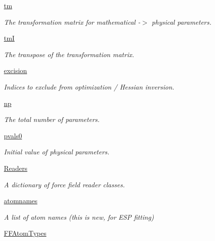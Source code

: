 \begin{DoxyCompactItemize}
\hyperlink{classforcebalance_1_1forcefield_1_1FF_a3ecc51355dbd97e0b1620007924fd2a3}{tm}
\begin{DoxyCompactList}\small\item\em \-The transformation matrix for mathematical -\/$>$ physical parameters. \end{DoxyCompactList}\item 
\hyperlink{classforcebalance_1_1forcefield_1_1FF_a9c49407242f4e8da1c42530825c6dbda}{tm\-I}
\begin{DoxyCompactList}\small\item\em \-The transpose of the transformation matrix. \end{DoxyCompactList}\item 
\hyperlink{classforcebalance_1_1forcefield_1_1FF_aa630b2a2142d81e30c5751ed13a7b777}{excision}
\begin{DoxyCompactList}\small\item\em \-Indices to exclude from optimization / \-Hessian inversion. \end{DoxyCompactList}\item 
\hyperlink{classforcebalance_1_1forcefield_1_1FF_a5f04fa76bff707688a394542f893993d}{np}
\begin{DoxyCompactList}\small\item\em \-The total number of parameters. \end{DoxyCompactList}\item 
\hyperlink{classforcebalance_1_1forcefield_1_1FF_a4d6fbc589839d65aaf4dc417b05afba3}{pvals0}
\begin{DoxyCompactList}\small\item\em \-Initial value of physical parameters. \end{DoxyCompactList}\item 
\hyperlink{classforcebalance_1_1forcefield_1_1FF_ac9a93ef33ac311f6ce862f13a9087ba2}{\-Readers}
\begin{DoxyCompactList}\small\item\em \-A dictionary of force field reader classes. \end{DoxyCompactList}\item 
\hyperlink{classforcebalance_1_1forcefield_1_1FF_a9a846375f65457ebc1cd35311aec94fd}{atomnames}
\begin{DoxyCompactList}\small\item\em \-A list of atom names (this is new, for \-E\-S\-P fitting) \end{DoxyCompactList}\item 
\hyperlink{classforcebalance_1_1forcefield_1_1FF_a30ed6d22628b40ff926588297550568f}{\-F\-F\-Atom\-Types}

\end{DoxyCompactItemize}
